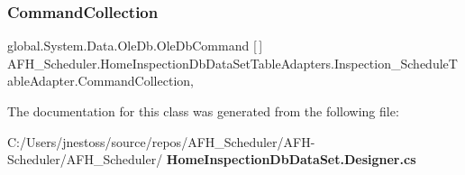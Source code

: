 \subsubsection{CommandCollection}
{\footnotesize\ttfamily global.\+System.\+Data.\+Ole\+Db.\+Ole\+Db\+Command [$\,$] A\+F\+H\+\_\+\+Scheduler.\+Home\+Inspection\+Db\+Data\+Set\+Table\+Adapters.\+Inspection\+\_\+\+Schedule\+Table\+Adapter.\+Command\+Collection\hspace{0.3cm}{\ttfamily [get]}, {\ttfamily [protected]}}



The documentation for this class was generated from the following file\+:\begin{DoxyCompactItemize}
\item 
C\+:/\+Users/jnestoss/source/repos/\+A\+F\+H\+\_\+\+Scheduler/\+A\+F\+H-\/\+Scheduler/\+A\+F\+H\+\_\+\+Scheduler/\textbf{ Home\+Inspection\+Db\+Data\+Set.\+Designer.\+cs}\end{DoxyCompactItemize}
